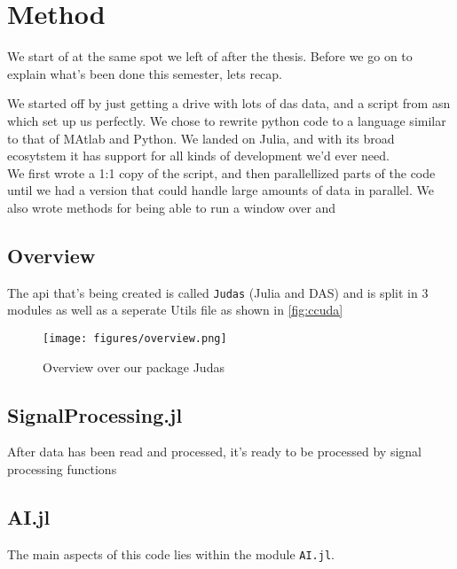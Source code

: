 \chapter{Method}
\label{chap:method}

We start of at the same spot we left of after the thesis. Before we go on to explain what's been done this semester, lets recap. 

We started off by just getting a drive with lots of \acrshort{das} data, and a script from \acrfull{asn} which set up us perfectly. We chose to rewrite python code to a language similar to that of MAtlab and Python. We landed on Julia, and with its broad ecosytstem it has support for all kinds of development we'd ever need. \\

We first wrote a 1:1 copy of the script, and then parallellized parts of the code until we had a version that could handle large amounts of data in parallel. We also wrote methods for being able to run a window over and 


\section{Overview}

The \acrshort{api} that's being created is called \texttt{Judas} (Julia and DAS) and is split in 3 modules as well as a seperate Utils file as shown in \ref{fig:ccuda}

\begin{figure}[h]
    \centering
    \texttt{[image: figures/overview.png]}
    \caption{Overview over our package Judas}
    \label{fig:judasoverview}
\end{figure}







\section{SignalProcessing.jl}

After data has been read and processed, it's ready to be processed by signal processing functions 

\section{AI.jl}

The main aspects of this code lies within the module \texttt{AI.jl}. 


